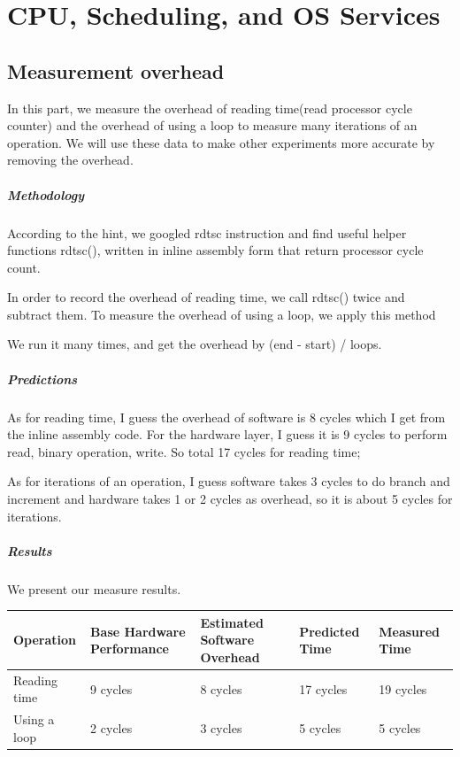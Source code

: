 \chapter{CPU, Scheduling, and OS Services}

\section{Measurement overhead}
In this part, we measure the overhead of reading time(read processor cycle counter) and the overhead of using a loop to measure many iterations of an operation. We will use these data to make other experiments more accurate by removing the overhead.

\paragraph{Methodology}
According to the hint, we googled rdtsc instruction and find useful helper functions rdtsc()\cite{rdtsc}, written in inline assembly form that return processor cycle count. 

In order to record the overhead of reading time, we call rdtsc() twice and subtract them. To measure the overhead of using a loop, we apply this method

We run it many times, and get the overhead by (end - start) / loops.

\paragraph{Predictions}
As for reading time, I guess the overhead of software is 8 cycles which I get from the inline assembly code. For the hardware layer, I guess it is 9 cycles to perform read, binary operation, write. So total 17 cycles for reading time; 

As for iterations of an operation, I guess software takes 3 cycles to do branch and increment and hardware takes 1 or 2 cycles as overhead, so it is about 5 cycles for iterations.

\paragraph{Results}
We present our measure results.

\begin{center}
\begin{tabular}{| p{3cm} | p{3cm} | p{3cm} | p{3cm} | p{3cm} |}
Operation  & Base Hardware Performance  & Estimated Software Overhead  & Predicted Time  & Measured Time   \\
\hline
Reading time& 9 cycles& 8 cycles& 17 cycles& 19 cycles \\
Using a loop  & 2 cycles& 3 cycles& 5 cycles& 5 cycles\\
\end{tabular}
\end{center}

